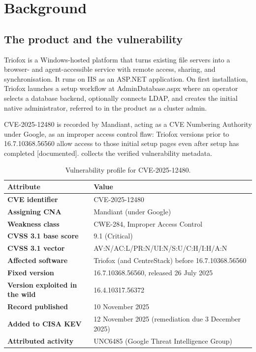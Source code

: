 \documentclass[11pt,a4paper]{article}
\newcommand{\code}[1]{{\small\ttfamily #1}}
\newcommand{\tier}[1]{{\small\color{meta}\textsf{[#1]}}}
\begin{document}
\section{Background}

\subsection{The product and the vulnerability}

Triofox is a Windows-hosted platform that turns existing file servers into a browser- and agent-accessible service with remote access, sharing, and synchronisation. It runs on IIS as an ASP.NET application. On first installation, Triofox launches a setup workflow at \code{AdminDatabase.aspx} where an operator selects a database backend, optionally connects LDAP, and creates the initial native administrator, referred to in the product as a cluster admin.

CVE-2025-12480 is recorded by Mandiant, acting as a CVE Numbering Authority under Google, as an improper access control flaw: Triofox versions prior to 16.7.10368.56560 allow access to those initial setup pages even after setup has completed \tier{documented}.  collects the verified vulnerability metadata.

\begin{table}[htbp]
\centering
\caption{Vulnerability profile for CVE-2025-12480.}
\label{tab:profile}
\small
\begin{tabularx}{\textwidth}{>{\bfseries}p{} X}
\toprule
\rowcolor{headergrey}\textbf{Attribute} & \textbf{Value} \\
\midrule
CVE identifier & CVE-2025-12480 \\
Assigning CNA & Mandiant (under Google) \\
Weakness class & CWE-284, Improper Access Control \\
CVSS 3.1 base score & 9.1 (Critical) \\
CVSS 3.1 vector & AV:N/AC:L/PR:N/UI:N/S:U/C:H/I:H/A:N \\
Affected software & Triofox (and CentreStack) before 16.7.10368.56560 \\
Fixed version & 16.7.10368.56560, released 26 July 2025 \\
Version exploited in the wild & 16.4.10317.56372 \\
Record published & 10 November 2025 \\
Added to CISA KEV & 12 November 2025 (remediation due 3 December 2025) \\
Attributed activity & UNC6485 (Google Threat Intelligence Group) \\
\bottomrule
\end{tabularx}
\end{table}
\end{document}
